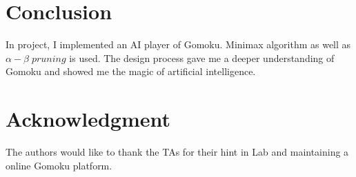 \documentclass[conference]{IEEEtran}
\begin{document}
  \section{Conclusion}
  In project, I implemented an AI player of Gomoku. Minimax algorithm as well as $\alpha-\beta \;pruning$ is used. The design process gave me a deeper understanding of Gomoku and showed me the magic of artificial intelligence.

  \section*{Acknowledgment}

  The authors would like to thank the TAs for their hint in Lab and maintaining a online Gomoku platform.
  

    
    

  
  
  
\end{document}
